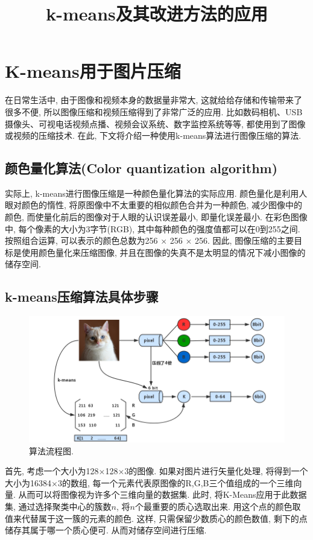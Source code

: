 \documentclass[lang=cn,11pt]{elegantpaper}
\title{k-means及其改进方法的应用}
\date{}
\begin{document}

\newpage
\maketitle

	
\tableofcontents
\thispagestyle{empty}
\newpage
\normalsize
{}

\section{K-means用于图片压缩}
在日常生活中, 由于图像和视频本身的数据量非常大, 这就给给存储和传输带来了很多不便, 所以图像压缩和视频压缩得到了非常广泛的应用. 比如数码相机、USB 摄像头、可视电话视频点播、视频会议系统、数字监控系统等等, 都使用到了图像或视频的压缩技术. 在此, 下文将介绍一种使用k-means算法进行图像压缩的算法. 
\subsection{颜色量化算法(Color quantization algorithm)}
实际上, k-means进行图像压缩是一种颜色量化算法的实际应用. 颜色量化是利用人眼对颜色的惰性, 将原图像中不太重要的相似颜色合并为一种颜色, 减少图像中的颜色, 而使量化前后的图像对于人眼的认识误差最小, 即量化误差最小. 在彩色图像中, 每个像素的大小为3字节(RGB), 其中每种颜色的强度值都可以在0到255之间. 按照组合运算, 可以表示的颜色总数为256 $\times$ 256 $\times$ 256. 因此, 图像压缩的主要目标是使用颜色量化来压缩图像, 并且在图像的失真不是太明显的情况下减小图像的储存空间. 
\subsection{k-means压缩算法具体步骤}
\begin{figure}[ht]
    \centering
    \includegraphics[width=.8\textwidth]{Flow}
    \caption{算法流程图. \label{fig:flow}}
\end{figure}
首先, 考虑一个大小为128$\times$128$\times$3的图像. 如果对图片进行矢量化处理, 将得到一个大小为16384$\times$3的数组, 每一个元素代表原图像的R,G,B三个值组成的一个三维向量. 从而可以将图像视为许多个三维向量的数据集. 此时, 将K-Means应用于此数据集, 通过选择聚类中心的簇数$n$, 将$n$个最重要的质心选取出来. 用这个点的颜色取值来代替属于这一簇的元素的颜色. 这样, 只需保留少数质心的颜色数值, 剩下的点储存其属于哪一个质心便可. 从而对储存空间进行压缩. 
\end{document}
